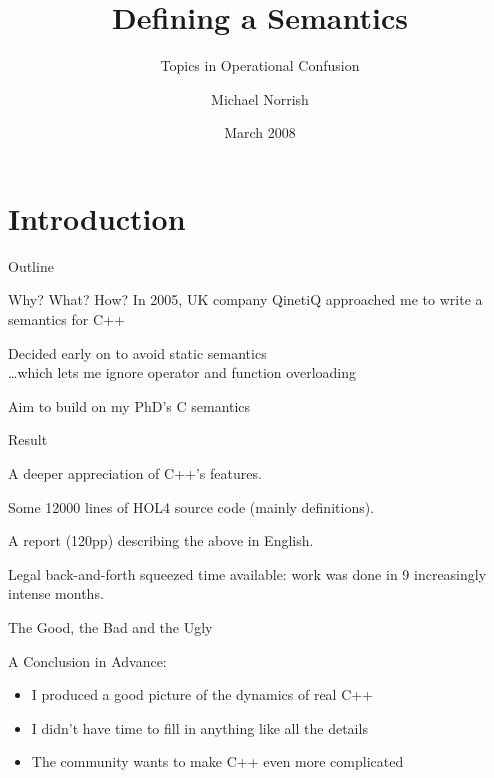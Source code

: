 \documentclass[compress,dvips,color=usenames,xcolor=dvipsnames]{beamer}
\title{Defining a \cpp{} Semantics}
\subtitle{Topics in Operational Confusion}
\author{Michael Norrish}
\institute[NICTA]{Canberra Research Lab., NICTA}
\date{March 2008}
\newcommand{\cpp}{\mbox{C\hspace{-.1em}+\hspace{-.05em}+}}
\begin{document}
\frame{\titlepage}
\section{Introduction}
\begin{frame}{Outline}\tableofcontents\end{frame}

\begin{frame}{Why? What? How?}
In 2005, UK company QinetiQ approached me to write a semantics
  for \cpp{}

\bigskip
Decided early on to avoid static semantics\\[1mm]
  \quad\quad\dots {\footnotesize which lets me ignore operator and function overloading}

\bigskip
Aim to build on my PhD's C semantics
\end{frame}

\begin{frame}{Result}

A deeper appreciation of \cpp's features.

\bigskip
Some 12\hspace{.1em}000 lines of HOL4 source code (mainly definitions).

\bigskip
A report (120pp) describing the above in English.

\bigskip
Legal back-and-forth squeezed time available: work was done in 9
increasingly intense months.

\end{frame}

\begin{frame}{The Good, the Bad and the Ugly}

A Conclusion in Advance:
\begin{itemize}
\item I produced a good picture of the dynamics of real \cpp
\item I didn't have time to fill in anything like all the details
\item The community wants to make \cpp{} even more complicated
\end{itemize}

\end{frame}
\end{document}
